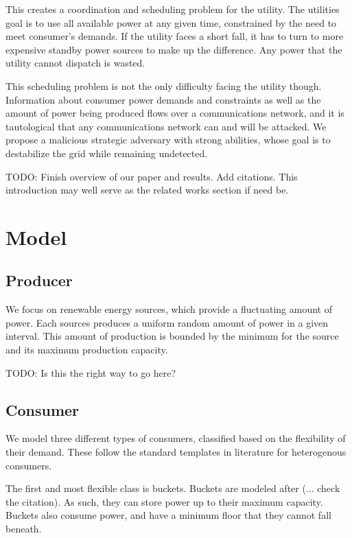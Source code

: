 \documentclass[conference]{IEEEtran}
\begin{document}
This creates a coordination and scheduling problem for the utility.  The utilities goal is to use all available power at any
given time, constrained by the need to meet consumer's demands.  If the utility faces a short fall, it has to turn to more 
expensive standby power sources to make up the difference.  Any power that the utility cannot dispatch is wasted.

This scheduling problem is not the only difficulty facing the utility though.  Information about consumer power demands and 
constraints as well as the amount of power being produced flows over a communications network, and it is tautological that 
any communications network can and will be attacked.  We propose a malicious strategic adversary with strong abilities, whose
goal is to destabilize the grid while remaining undetected. 

TODO: Finish overview of our paper and results.  Add citations.  This introduction may well serve as the related works 
section if need be.

\section{Model}

\subsection{Producer}

We focus on renewable energy sources, which provide a fluctuating amount of power.  Each sources produces a uniform random 
amount of power in a given interval.  This amount of production is bounded by the minimum for the source and its maximum
production capacity.

TODO: Is this the right way to go here?

\subsection{Consumer}

We model three different types of consumers, classified based on the flexibility of their demand.  These follow the standard
templates in literature for heterogenous consumers.

The first and most flexible class is buckets.  Buckets are modeled after (... check the citation).  As such, they can store
power up to their maximum capacity.  Buckets also consume power, and have a minimum floor that they cannot fall beneath.
\end{document}
